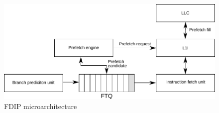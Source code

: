 \begin{figure}
\centering
\includegraphics[width=.9\columnwidth, trim=0 0 0 0, clip]{figures/fdip1.pdf}
\caption{FDIP microarchitecture}
\vspace{-0.1in}
\label{fig:fdip}
\end{figure}